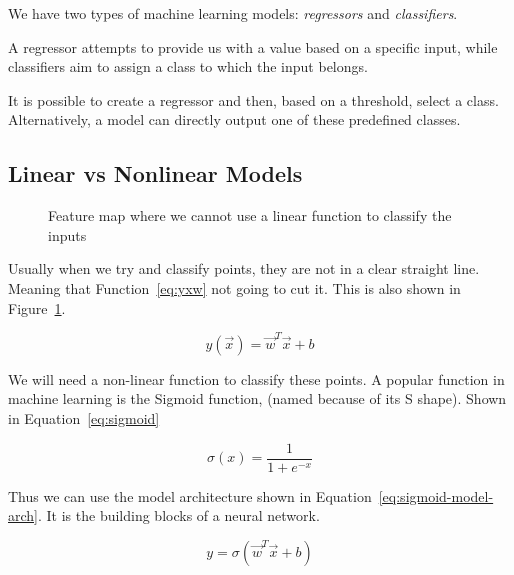 \documentclass[twocolumn]{article}
\begin{document}
We have two types of machine learning models: \emph{regressors} and
\emph{classifiers}.

A regressor attempts to provide us with a value based on a specific input,
while classifiers aim to assign a class to which the input belongs.

It is possible to create a regressor and then, based on a threshold, select a
class. Alternatively, a model can directly output one of these predefined
classes.

\subsection{Linear vs Nonlinear Models}

\begin{figure}[htbp]
  \centering
  
  \caption{Feature map where we cannot use a linear function to classify the
    inputs}
  \label{fig:nolinear}
\end{figure}

Usually when we try and classify points, they are not in a clear straight
line. Meaning that Function~\ref{eq:yxw} not going to cut it. This is also
shown in Figure~\ref{fig:nolinear}.

\begin{equation}
    y(\vec{x}) = \vec{w}^T\vec{x} + b
    \label{eq:yxw}
\end{equation}

We will need a non-linear function to classify these points. A popular
function in machine learning is the Sigmoid function, (named because of its S
shape). Shown in Equation~\ref{eq:sigmoid}

\begin{equation}
    \sigma(x) = \frac{1}{1 + e^{-x}}
    \label{eq:sigmoid}
\end{equation}

Thus we can use the model architecture shown in
Equation~\ref{eq:sigmoid-model-arch}. It is the building blocks of a neural
network.

\begin{equation}
    y = \sigma(\vec{w}^T\vec{x} + b)
    \label{eq:sigmoid-model-arch}
\end{equation}
\end{document}

